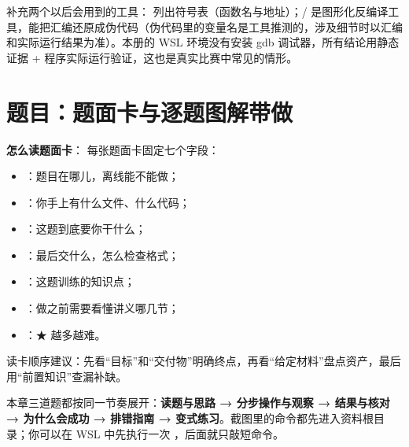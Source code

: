 \documentclass[UTF8,12pt,oneside]{ctexbook}
\begin{document}
补充两个以后会用到的工具： 列出符号表（函数名与地址）；/ 是图形化反编译工具，能把汇编还原成伪代码（伪代码里的变量名是工具推测的，涉及细节时以汇编和实际运行结果为准）。本册的 WSL 环境没有安装 gdb 调试器，所有结论用静态证据 + 程序实际运行验证，这也是真实比赛中常见的情形。


\chapter{题目：题面卡与逐题图解带做}



\textbf{怎么读题面卡}：
每张题面卡固定七个字段：
\begin{itemize}
\item {}：题目在哪儿，离线能不能做；
\item {}：你手上有什么文件、什么代码；
\item {}：这题到底要你干什么；
\item {}：最后交什么，怎么检查格式；
\item {}：这题训练的知识点；
\item {}：做之前需要看懂讲义哪几节；
\item {}：★ 越多越难。
\end{itemize}
读卡顺序建议：先看“目标”和“交付物”明确终点，再看“给定材料”盘点资产，最后用“前置知识”查漏补缺。


本章三道题都按同一节奏展开：\textbf{读题与思路 → 分步操作与观察 → 结果与核对 → 为什么会成功 → 排错指南 → 变式练习}。截图里的命令都先进入资料根目录；你可以在 WSL 中先执行一次 ，后面就只敲短命令。

\end{document}
